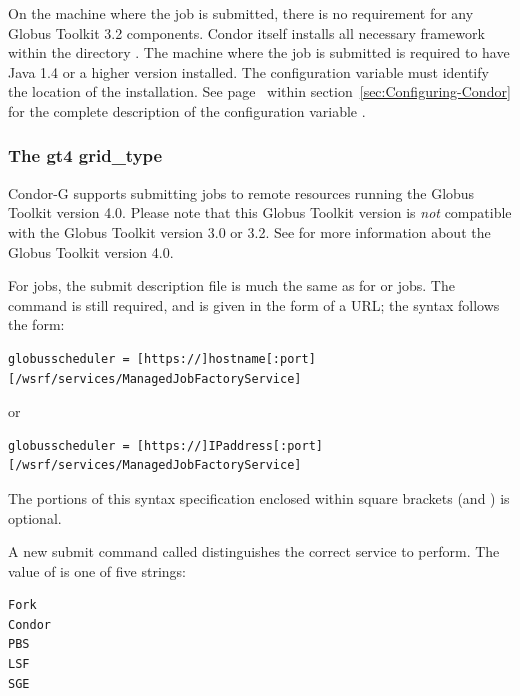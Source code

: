 
On the machine where the job is submitted,
there is no requirement for any Globus Toolkit 3.2 components.
Condor itself installs all necessary framework within the directory 
.
The machine where the job is submitted
is required to
have Java 1.4 or a higher version installed.
The configuration variable 
must identify the location of the installation.
See page~\pageref{param:Java} within
section~\ref{sec:Configuring-Condor}
for the complete description of the configuration variable .


\subsubsection{\label{sec:Using-gt4}The gt4 grid\_type}

Condor-G supports submitting jobs to remote resources running
the Globus Toolkit version 4.0.
Please note that this Globus Toolkit version
is \emph{not} compatible with the Globus Toolkit version 3.0 or 3.2.
See
for more information about the Globus Toolkit version 4.0.

For   jobs,
the submit description file is much the same as for
  or  jobs.
The  command is still required,
and is given in the form of a URL; the syntax follows the form:
\footnotesize
\begin{verbatim}
globusscheduler = [https://]hostname[:port][/wsrf/services/ManagedJobFactoryService]
\end{verbatim}
\normalsize

or
\footnotesize
\begin{verbatim}
globusscheduler = [https://]IPaddress[:port][/wsrf/services/ManagedJobFactoryService]
\end{verbatim}
\normalsize
The portions of this syntax specification enclosed within
square brackets (\Lbr and \Rbr) is optional.

A new submit command called 
distinguishes the correct service to perform.
The value of  is one of five
strings:
\begin{verbatim}
Fork
Condor
PBS
LSF
SGE
\end{verbatim}

